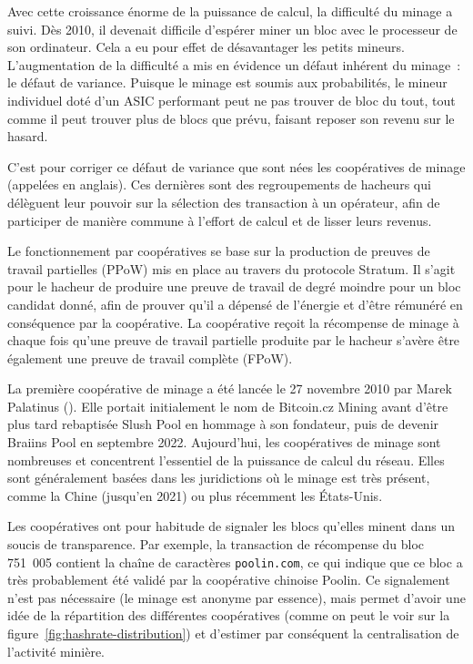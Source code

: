 
Avec cette croissance énorme de la puissance de calcul, la difficulté du minage a suivi. Dès 2010, il devenait difficile d'espérer miner un bloc avec le processeur de son ordinateur. Cela a eu pour effet de désavantager les petits mineurs. L'augmentation de la difficulté a mis en évidence un défaut inhérent du minage~: le défaut de variance. Puisque le minage est soumis aux probabilités, le mineur individuel doté d'un ASIC performant peut ne pas trouver de bloc du tout, tout comme il peut trouver plus de blocs que prévu, faisant reposer son revenu sur le hasard.

C'est pour corriger ce défaut de variance que sont nées les coopératives de minage (appelées  en anglais). Ces dernières sont des regroupements de hacheurs qui délèguent leur pouvoir sur la sélection des transaction à un opérateur, afin de participer de manière commune à l'effort de calcul et de lisser leurs revenus.

Le fonctionnement par coopératives se base sur la production de preuves de travail partielles (PPoW) mis en place au travers du protocole Stratum. Il s'agit pour le hacheur de produire une preuve de travail de degré moindre pour un bloc candidat donné, afin de prouver qu'il a dépensé de l'énergie et d'être rémunéré en conséquence par la coopérative. La coopérative reçoit la récompense de minage à chaque fois qu'une preuve de travail partielle produite par le hacheur s'avère être également une preuve de travail complète (FPoW).


La première coopérative de minage a été lancée le 27 novembre 2010 par Marek Palatinus (). Elle portait initialement le nom de Bitcoin.cz Mining avant d'être plus tard rebaptisée Slush Pool en hommage à son fondateur, puis de devenir Braiins Pool en septembre 2022. Aujourd'hui, les coopératives de minage sont nombreuses et concentrent l'essentiel de la puissance de calcul du réseau. Elles sont généralement basées dans les juridictions où le minage est très présent, comme la Chine (jusqu'en 2021) ou plus récemment les États-Unis.

Les coopératives ont pour habitude de signaler les blocs qu'elles minent dans un soucis de transparence. Par exemple, la transaction de récompense du bloc 751~005 contient la chaîne de caractères \texttt{poolin.com}, ce qui indique que ce bloc a très probablement été validé par la coopérative chinoise Poolin. Ce signalement n'est pas nécessaire (le minage est anonyme par essence), mais permet d'avoir une idée de la répartition des différentes coopératives (comme on peut le voir sur la figure~\ref{fig:hashrate-distribution}) et d'estimer par conséquent la centralisation de l'activité minière.

